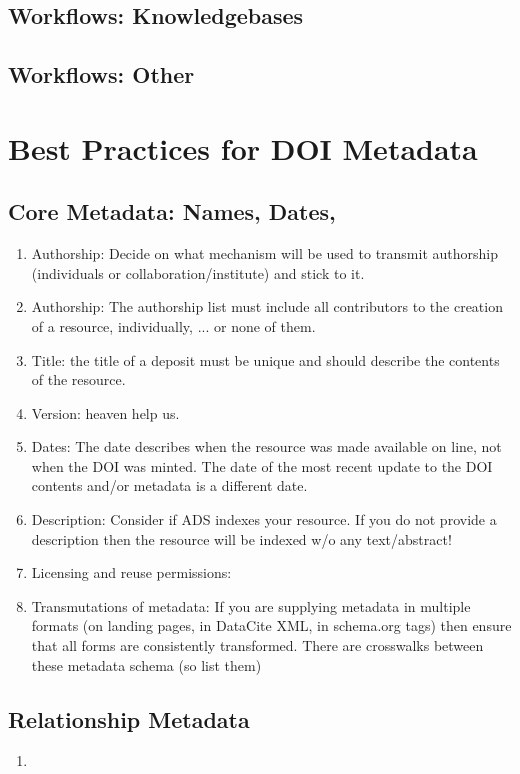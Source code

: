 \documentclass[11pt,a4paper]{ivoa}
\begin{document}
\subsection{Workflows: Knowledgebases}
\subsection{Workflows: Other}

\section{Best Practices for DOI Metadata}

\subsection{Core Metadata: Names, Dates, }
\begin{enumerate}
\item Authorship: Decide on what mechanism will be used to transmit authorship (individuals or collaboration/institute) and stick to it.
\item Authorship: The authorship list must include all contributors to the creation of a resource, individually, ... or none of them.
\item Title: the title of a deposit must be unique and should describe the contents of the resource.
\item Version: heaven help us.
\item Dates: The date describes when the resource was made available on line, not when the DOI was minted. 
The date of the most recent update to the DOI contents and/or metadata is a different date.
\item Description: Consider if ADS indexes your resource. If you do not provide a description then the resource will be indexed w/o any text/abstract!
\item Licensing and reuse permissions:
\item Transmutations of metadata: 
If you are supplying metadata in multiple formats (on landing pages, in DataCite XML, in schema.org tags)
then ensure that all forms are consistently transformed. 
There are crosswalks between these metadata schema (so list them)
\end{enumerate}

\subsection{Relationship Metadata}
\begin{enumerate}
\item 
\end{enumerate}
\end{document}

